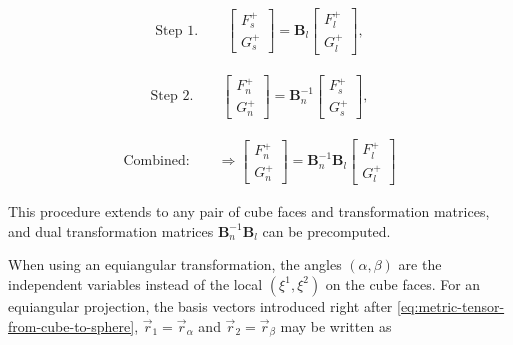 \documentclass{report}
\begin{document}
\begin{align}
\textrm{Step 1.} \qquad
    \left[ 
        \begin{array}{c}
             F^{+}_s \\
             G^{+}_s
        \end{array}
    \right] = 
        \boldsymbol{B}_l
    \left[ 
        \begin{array}{c}
             F^{+}_l \\
             G^{+}_l
        \end{array}
    \right],
\end{align}

\begin{align}
\textrm{Step 2.} \qquad
    \left[ 
        \begin{array}{c}
             F^{+}_n \\
             G^{+}_n
        \end{array}
    \right] = 
        \boldsymbol{B}^{-1}_n
    \left[ 
        \begin{array}{c}
             F^{+}_s \\
             G^{+}_s
        \end{array}
    \right],
\end{align}

\begin{align}
\textrm{Combined:} \qquad 
\Rightarrow
    \left[ 
        \begin{array}{c}
             F^{+}_n \\
             G^{+}_n
        \end{array}
    \right] = 
        \boldsymbol{B}^{-1}_n\boldsymbol{B}_l
    \left[ 
        \begin{array}{c}
             F^{+}_l \\
             G^{+}_l
        \end{array}
    \right]
\end{align}

\noindent This procedure extends to any pair of cube faces and transformation matrices, and dual transformation matrices $\boldsymbol{B}^{-1}_n\boldsymbol{B}_l$ can be precomputed.

When using an equiangular transformation, the angles $(\alpha,\beta)$ are the independent variables instead of the local $(\xi^1, \xi^2)$ on the cube faces. For an equiangular projection, the basis vectors introduced right after \eqref{eq:metric-tensor-from-cube-to-sphere}, $\vec{r}_1 = \vec{r}_\alpha$ and $\vec{r}_2 =\vec{r}_{\beta} $ may be written as
\end{document}
